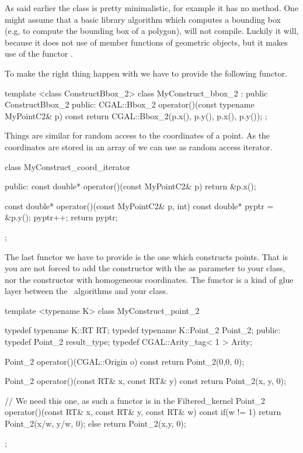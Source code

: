As said earlier the class is pretty minimalistic, for
example it has no  method.  One
might assume that a basic library algorithm which computes 
a bounding box (e.g, to compute the bounding box of a polygon),
will not compile. Luckily it will, because it does not
use of member functions of geometric objects, but it makes
use of the functor .

To make the right thing happen with  we
have to provide the following functor.

\ccHtmlLinksOff
\begin{ccExampleCode}
template <class ConstructBbox_2>
class MyConstruct_bbox_2 : public ConstructBbox_2 {
public:
  CGAL::Bbox_2 operator()(const typename MyPointC2& p) const {
    return CGAL::Bbox_2(p.x(), p.y(), p.x(), p.y());
  }
};
\end{ccExampleCode}
\ccHtmlLinksOn


Things are similar for random access to the 
coordinates of a point. As the coordinates are stored
in an array of  we can use  as
random access iterator.

\ccHtmlLinksOff
\begin{ccExampleCode}
class MyConstruct_coord_iterator {
public:
  const double* operator()(const MyPointC2& p)
  {
    return &p.x();
  }

  const double* operator()(const MyPointC2& p, int)
  {
    const double* pyptr = &p.y();
    pyptr++;
    return pyptr;
  }
};
\end{ccExampleCode}
\ccHtmlLinksOn

The last functor we have to provide is the one which constructs
points. That is you are not forced to add the constructor 
with the  as parameter to your class, nor the constructor with 
homogeneous coordinates.
The functor is a kind of glue layer between the \cgal\ algorithms
and your class.

\ccHtmlLinksOff
\begin{ccExampleCode}
 template <typename K>
  class MyConstruct_point_2
  {
    typedef typename K::RT         RT;
    typedef typename K::Point_2    Point_2;
  public:
    typedef Point_2          result_type;
    typedef CGAL::Arity_tag< 1 >   Arity;

    Point_2
    operator()(CGAL::Origin o) const
    { return Point_2(0,0, 0); }

    Point_2
    operator()(const RT& x, const RT& y) const
    { return Point_2(x, y, 0); }

    
    // We need this one, as such a functor is in the Filtered_kernel
    Point_2
    operator()(const RT& x, const RT& y, const RT& w) const
    { 
      if(w != 1){
	return Point_2(x/w, y/w, 0); 
      } else {
	return Point_2(x,y, 0);
      }
    }
  };

\end{ccExampleCode}
\ccHtmlLinksOn


